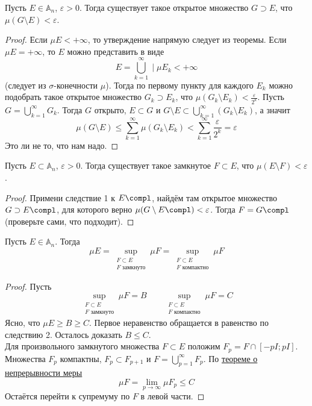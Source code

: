 \documentclass{article}
\let\eps\varepsilon
\begin{document}
    \begin{corollary}
        Пусть $E\in\mathbb A_n$, $\eps>0$. Тогда существует такое открытое множество $G\supset E$, что $\mu(G\setminus E)<\eps$.
    \end{corollary}
    \begin{proof}
        Если $\mu E<+\infty$, то утверждение напрямую следует из теоремы. Если $\mu E=+\infty$, то $E$ можно представить в виде
        $$
        E=\bigcup\limits_{k=1}^\infty\mid\mu E_k<+\infty
        $$
        (следует из $\sigma$-конечности $\mu$). Тогда по первому пункту для каждого $E_k$ можно подобрать такое открытое множество $G_k\supset E_k$, что $\mu(G_k\setminus E_k)<\frac\eps{2^k}$. Пусть $G=\bigcup\limits_{k=1}^\infty G_k$. Тогда $G$ открыто, $E\subset G$ и $G\setminus E\subset\bigcup\limits_{k=1}^\infty(G_k\setminus E_k)$, а значит
        $$
        \mu(G\setminus E)\leqslant\sum\limits_{k=1}^\infty\mu(G_k\setminus E_k)<\sum\limits_{k=1}^\infty\frac\eps{2^k}=\eps
        $$
        Это ли не то, что нам надо.
    \end{proof}
    \begin{corollary}
        Пусть $E\subset\mathbb A_n$, $\eps>0$. Тогда существует такое замкнутое $F\subset E$, что $\mu(E\setminus F)<\eps$.
    \end{corollary}
    \begin{proof}
        Примени следствие 1 к $E\compl$, найдём там открытое множество $G\supset E\compl$, для которого верно $\mu(G\setminus E\compl)<\eps$. Тогда $F=G\compl$ (проверьте сами, что подходит).
    \end{proof}
    \begin{corollary}
        Пусть $E\in\mathbb A_n$. Тогда
        $$
        \mu E=\sup\limits_{\substack{F\subset E\\F\text{ замкнуто}}}\mu F=\sup\limits_{\substack{F\subset E\\F\text{ компактно}}}\mu F
        $$
    \end{corollary}
    \begin{proof}
        Пусть
        $$
        \sup\limits_{\substack{F\subset E\\F\text{ замкнуто}}}\mu F=B\qquad\sup\limits_{\substack{F\subset E\\F\text{ компактно}}}\mu F=C
        $$
        Ясно, что $\mu E\geqslant B\geqslant C$. Первое неравенство обращается в равенство по следствию 2. Осталось доказать $B\leqslant C$.\\
        Для произвольного замкнутого множества $F\subset E$ положим $F_p=F\cap[-pI;pI]$. Множества $F_p$ компактны, $F_p\subset F_{p+1}$ и $F=\bigcup\limits_{p=1}^\infty F_p$. По \hyperref[Непрерывность меры]{теореме о непрерывности меры}
        $$
        \mu F=\lim\limits_{p\to\infty}\mu F_p\leqslant C
        $$
        Остаётся перейти к супремуму по $F$ в левой части.
    \end{proof}
\end{document}
